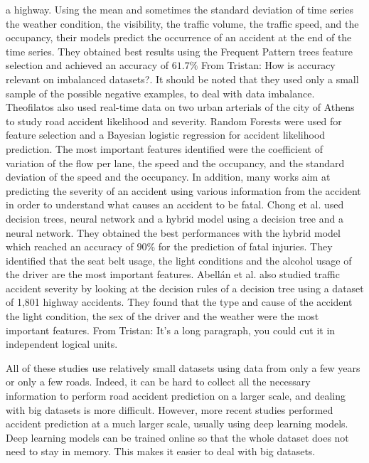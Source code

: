 \documentclass[conference]{IEEEtran}
\newcommand{\TG}[1]{\colorlet{saved}{.}\color{orange}From Tristan: #1\color{saved}}
\newcommand{\english}[1]{\uwave{#1}}  %
\begin{document}
a highway. Using the mean and sometimes the standard deviation of time
series \english{corresponding to} the weather condition, the visibility, the traffic
volume, the traffic speed, and the occupancy, their models predict the
occurrence of an accident at the end of the time series. They obtained
best results using the Frequent Pattern trees feature selection and achieved
an accuracy of $61.7\%$ \TG{How is accuracy relevant on imbalanced datasets?}. It should be noted that they used only a small sample of the
possible negative examples, to deal with data imbalance. Theofilatos\cite{Theofilatos2017} also used
real-time data on two urban arterials of the city of Athens to study road
accident likelihood and severity. Random Forests were used for feature
selection and a Bayesian logistic regression for accident likelihood
prediction. The most important features identified were the coefficient of
variation of the flow per lane, the speed and the occupancy, and the
standard deviation of the speed and the occupancy. In addition, many
works aim at predicting the severity of an accident using various
information from the accident in order to understand what causes an
accident to be fatal. Chong et al.\cite{Chong2005} used decision trees,
neural network and a hybrid model using a decision tree and a neural
network. They obtained the best performances with the hybrid model which
reached an accuracy of $90\%$ for the prediction of fatal injuries. They
identified that the seat belt usage, the light conditions and the alcohol
usage of the driver are the most important features. Abellán et al.
\cite{Abellan2013} also studied traffic accident severity by looking at the
decision rules of a decision tree using a dataset of 1,801 highway
accidents. They found that the type and cause of the accident the light
condition, the sex of the driver and the weather were the most important
features. \TG{It's a long paragraph, you could cut it in independent logical units.}

All of these studies use relatively small datasets using data from only a
few years or only a few roads. Indeed, it can be hard to collect all the
necessary information to perform road accident prediction on a larger
scale, and dealing with big datasets is more difficult. However, more
recent studies performed accident prediction at a much larger scale,
usually using deep learning models. Deep learning models can be trained
online so that the whole dataset does not need to stay in memory. This
makes it easier to deal with big datasets.
\end{document}
